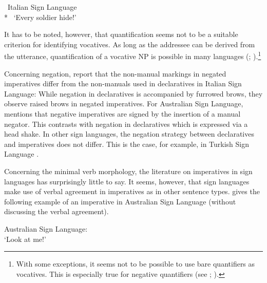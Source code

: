 \begin{exe}
\ex \textcolor{white}{*}Italian Sign Language \\ *
\glt \textcolor{white}{*}`Every soldier hide!' \label{imperativesubjectslisb}
\end{exe}

\noindent It has to be noted, however, that quantification seems not to be a suitable criterion for identifying vocatives. As long as the addressee can be derived from the utterance, quantification of a vocative NP is possible in many languages (\citealt[194--197]{potsdam1996syntactic}; \citealt[815--816]{croitor2013constituents}).\footnote{With some exceptions, it seems not to be possible to use bare quantifiers as vocatives. This is especially true for negative quantifiers (see \citealt[414--415]{portner2007structions}; \citealt[58--59]{hill2013vocatives}).}

Concerning negation, \citet{donati2017searching} report that the non-manual markings in negated imperatives differ from the non-manuals used in declaratives in Italian Sign Language: While negation in declaratives is accompanied by furrowed brows, they observe raised brows in negated imperatives. For Australian Sign Language, \citet[v196--197]{johnston1989auslan} mentions that negative imperatives are signed by the insertion of a manual negator. This contrasts with negation in declaratives which is expressed via a head shake. In other sign languages, the negation strategy between declaratives and imperatives does not differ. This is the case, for example, in Turkish Sign Language \citep{ozsoy2014commands}. %

Concerning the minimal verb morphology, the literature on imperatives in sign languages has surprisingly little to say. It seems, however, that sign languages make use of verbal agreement in imperatives as in other sentence types.  \citet[195]{johnston1989auslan} gives the following example of an imperative in Australian Sign Language (without discussing the verbal agreement).


\begin{exe}
\ex Australian Sign Language: \\ 
\glt `Look at me!' \label{imperativeauslan}
\end{exe}

